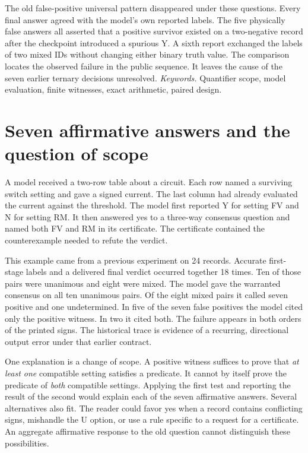 \documentclass[12pt,letterpaper]{article}
\begin{document}
The old false-positive universal pattern disappeared under these questions. Every final answer agreed with the model's own reported labels. The five physically false answers all asserted that a positive survivor existed on a two-negative record after the checkpoint introduced a spurious Y. A sixth report exchanged the labels of two mixed IDs without changing either binary truth value. The comparison locates the observed failure in the public sequence. It leaves the cause of the seven earlier ternary decisions unresolved.
\vfill\small\emph{Keywords.} Quantifier scope, model evaluation, finite witnesses, exact arithmetic, paired design.\normalsize\clearpage\tableofcontents\clearpage{}

\section{Seven affirmative answers and the question of scope}
A model received a two-row table about a circuit. Each row named a surviving switch setting and gave a signed current. The last column had already evaluated the current against the threshold. The model first reported Y for setting FV and N for setting RM. It then answered yes to a three-way consensus question and named both FV and RM in its certificate. The certificate contained the counterexample needed to refute the verdict.

This example came from a previous experiment on 24 records. Accurate first-stage labels and a delivered final verdict occurred together 18 times. Ten of those pairs were unanimous and eight were mixed. The model gave the warranted consensus on all ten unanimous pairs. Of the eight mixed pairs it called seven positive and one undetermined. In five of the seven false positives the model cited only the positive witness. In two it cited both. The failure appears in both orders of the printed signs. The historical trace is evidence of a recurring, directional output error under that earlier contract.

One explanation is a change of scope. A positive witness suffices to prove that \emph{at least one} compatible setting satisfies a predicate. It cannot by itself prove the predicate of \emph{both} compatible settings. Applying the first test and reporting the result of the second would explain each of the seven affirmative answers. Several alternatives also fit. The reader could favor yes when a record contains conflicting signs, mishandle the U option, or use a rule specific to a request for a certificate. An aggregate affirmative response to the old question cannot distinguish these possibilities.
\end{document}
